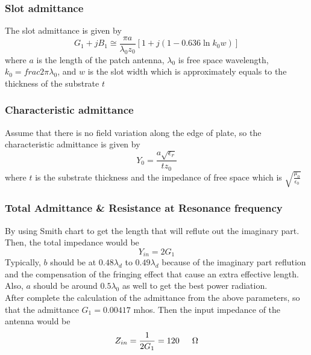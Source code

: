 \documentclass[11pt,a4paper]{article}
\begin{document}
      \subsubsection{Slot admittance}
        \indent The slot admittance is given by \cite{CaM:81}
        \begin{equation}
          G_1 + jB_1 \cong \frac{\pi {a}}{\lambda_0 z_0}[1 + j(1-0.636\ln{k_0w})]
        \end{equation}
        \indent where $a$ is the length of the patch antenna, $\lambda_0$ is free space wavelength,
                $k_0 = frac{2\pi}{\lambda_0}$, and $w$ is the slot width which is approximately
                equals to the thickness of the substrate $t$ 

      \subsubsection{Characteristic admittance}
        \indent Assume that there is no field variation along the edge of plate, so the characteristic admittance is given by \cite{CaM:81}
        \begin{equation}
          Y_0 = \frac{a\sqrt{\epsilon_r}}{tz_0}
        \end{equation}
        \indent where $t$ is the substrate thickness and the impedance of free space which is $\sqrt{\frac{\mu_0}{\epsilon_0}}$

      \subsubsection{Total Admittance \& Resistance at Resonance frequency}
        \indent By using Smith chart to get the length that will reflute out the imaginary part. Then, the total impedance would be
        \begin{equation}
          Y_{in} = 2G_1
        \end{equation}
        \indent Typically, $b$ should be at $0.48\lambda_d$ to $0.49\lambda_d$ because of the imaginary part reflution
                and the compensation of the fringing effect that cause an extra effective length. Also, $a$ should be around
                $0.5\lambda_0$ as well to get the best power radiation.  \\[1ex]
        \indent After complete the calculation of the admittance from the above parameters, so that the admittance
                $G_1 = 0.00417$ mhos. Then the input impedance of the antenna would be
        \begin{equation}
          Z_{in} = \frac{1}{2G_1} = 120 \indent \Omega
        \end{equation}
\end{document}
